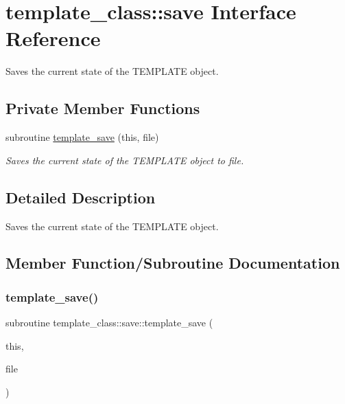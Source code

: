 \hypertarget{interfacetemplate__class_1_1save}{}\section{template\+\_\+class\+:\+:save Interface Reference}
\label{interfacetemplate__class_1_1save}


Saves the current state of the T\+E\+M\+P\+L\+A\+TE object.  


\subsection*{Private Member Functions}
\begin{DoxyCompactItemize}
\item 
subroutine \hyperlink{interfacetemplate__class_1_1save_abc0a077a0a2d0cafd9677ac6e2bb1c4c}{template\+\_\+save} (this, file)
\begin{DoxyCompactList}\small\item\em Saves the current state of the T\+E\+M\+P\+L\+A\+TE object to file. \end{DoxyCompactList}\end{DoxyCompactItemize}


\subsection{Detailed Description}
Saves the current state of the T\+E\+M\+P\+L\+A\+TE object. 

\subsection{Member Function/\+Subroutine Documentation}
\mbox{\label{interfacetemplate__class_1_1save_abc0a077a0a2d0cafd9677ac6e2bb1c4c}} 
\subsubsection{\texorpdfstring{template\+\_\+save()}{template\_save()}}
{\footnotesize\ttfamily subroutine template\+\_\+class\+::save\+::template\+\_\+save (\begin{DoxyParamCaption}\item[{type(\hyperlink{structtemplate__class_1_1template}{template}), intent(in)}]{this,  }\item[{character$\ast$($\ast$), intent(in)}]{file }\end{DoxyParamCaption})\hspace{0.3cm}{\ttfamily [private]}}



